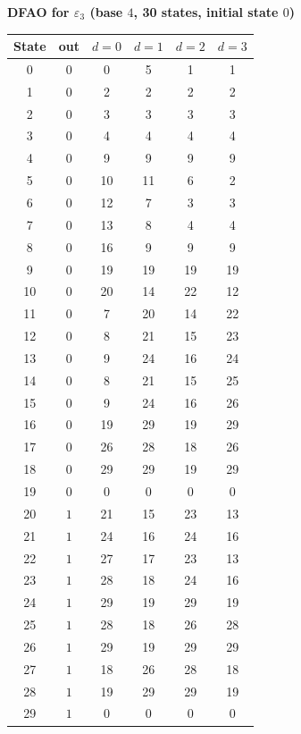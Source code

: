 \documentclass[12pt]{article}
\theoremstyle{definition}
\theoremstyle{remark}
\begin{document}
\noindent\begin{minipage}{\linewidth}
\textbf{DFAO for $\varepsilon_3$ (base $4$, 30 states, initial state $0$)}

\begin{center}
\renewcommand{\arraystretch}{1.1}
\begin{tabular}{c|c|cccc}
State & out & $d=0$ & $d=1$ & $d=2$ & $d=3$ \\\hline
0 & $0$ & 0 & 5 & 1 & 1 \\
1 & $0$ & 2 & 2 & 2 & 2 \\
2 & $0$ & 3 & 3 & 3 & 3 \\
3 & $0$ & 4 & 4 & 4 & 4 \\
4 & $0$ & 9 & 9 & 9 & 9 \\
5 & $0$ & 10 & 11 & 6 & 2 \\
6 & $0$ & 12 & 7 & 3 & 3 \\
7 & $0$ & 13 & 8 & 4 & 4 \\
8 & $0$ & 16 & 9 & 9 & 9 \\
9 & $0$ & 19 & 19 & 19 & 19 \\
10 & $0$ & 20 & 14 & 22 & 12 \\
11 & $0$ & 7 & 20 & 14 & 22 \\
12 & $0$ & 8 & 21 & 15 & 23 \\
13 & $0$ & 9 & 24 & 16 & 24 \\
14 & $0$ & 8 & 21 & 15 & 25 \\
15 & $0$ & 9 & 24 & 16 & 26 \\
16 & $0$ & 19 & 29 & 19 & 29 \\
17 & $0$ & 26 & 28 & 18 & 26 \\
18 & $0$ & 29 & 29 & 19 & 29 \\
19 & $0$ & 0 & 0 & 0 & 0 \\
20 & $1$ & 21 & 15 & 23 & 13 \\
21 & $1$ & 24 & 16 & 24 & 16 \\
22 & $1$ & 27 & 17 & 23 & 13 \\
23 & $1$ & 28 & 18 & 24 & 16 \\
24 & $1$ & 29 & 19 & 29 & 19 \\
25 & $1$ & 28 & 18 & 26 & 28 \\
26 & $1$ & 29 & 19 & 29 & 29 \\
27 & $1$ & 18 & 26 & 28 & 18 \\
28 & $1$ & 19 & 29 & 29 & 19 \\
29 & $1$ & 0 & 0 & 0 & 0 \\
\end{tabular}
\end{center}
\end{minipage}
\bigskip
\end{document}
